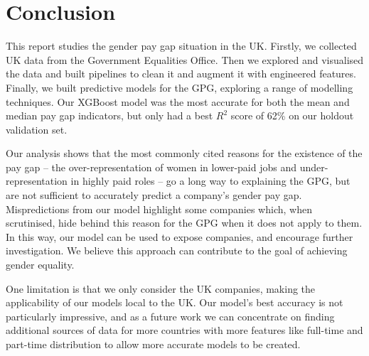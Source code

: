 
\section{Conclusion}
This report studies the gender pay gap situation in the UK. Firstly, we collected UK data from the Government Equalities Office. Then we explored and visualised the data and built pipelines to clean it and augment it with engineered features. Finally,  we built predictive models for the GPG, exploring a range of modelling techniques. Our XGBoost model was the most accurate for both the mean and median pay gap indicators, but only had a best $R^2$ score of 62\% on our holdout validation set.

Our analysis shows that the most commonly cited reasons for the existence of the pay gap -- the over-representation of women in lower-paid jobs and under-representation in highly paid roles -- go a long way to explaining the GPG, but are not sufficient to accurately predict a company's gender pay gap. Mispredictions from our model highlight some companies which, when scrutinised, hide behind this reason for the GPG when it does not apply to them. 
In this way, our model can be used to expose companies, and encourage further investigation. We believe this approach can contribute to the goal of achieving gender equality. 

One limitation is that we only consider the UK companies, making the applicability of our models local to the UK. Our model's best accuracy is not particularly impressive, and as a future work we can concentrate on finding additional sources of data for more countries with more features like full-time and part-time distribution to allow more accurate models to be created.

